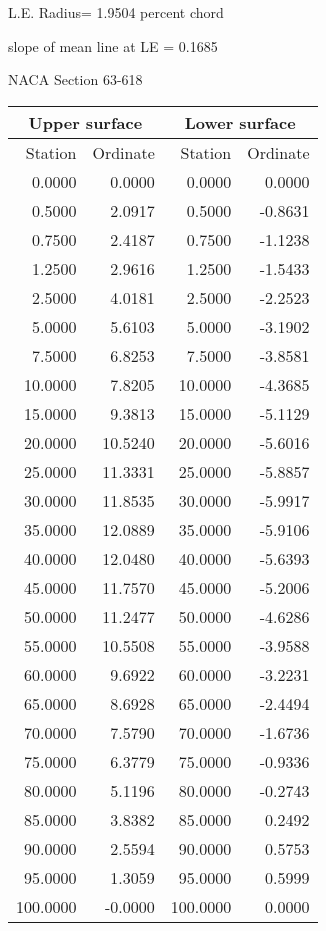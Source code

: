 \documentclass[11pt]{book}
\begin{document}
L.E. Radius=  1.9504 percent chord


 slope of mean line at LE =  0.1685
 \newpage
  \label{s63-618}
 \begin{Large}
 NACA Section 63-618
 \end{Large}
  
 \vspace{8mm}
 \begin{tabular}{|r|r|r|r|} \hline 
 \multicolumn{2}{|c|}{Upper surface} & \multicolumn{2}{|c|}{Lower surface} \\
 \hline
 Station & Ordinate & Station & Ordinate \\
 \hline
0.0000 & 0.0000 & 0.0000 & 0.0000 \\
0.5000 & 2.0917 & 0.5000 & -0.8631 \\
0.7500 & 2.4187 & 0.7500 & -1.1238 \\
1.2500 & 2.9616 & 1.2500 & -1.5433 \\
2.5000 & 4.0181 & 2.5000 & -2.2523 \\
5.0000 & 5.6103 & 5.0000 & -3.1902 \\
7.5000 & 6.8253 & 7.5000 & -3.8581 \\
10.0000 & 7.8205 & 10.0000 & -4.3685 \\
15.0000 & 9.3813 & 15.0000 & -5.1129 \\
20.0000 & 10.5240 & 20.0000 & -5.6016 \\
25.0000 & 11.3331 & 25.0000 & -5.8857 \\
30.0000 & 11.8535 & 30.0000 & -5.9917 \\
35.0000 & 12.0889 & 35.0000 & -5.9106 \\
40.0000 & 12.0480 & 40.0000 & -5.6393 \\
45.0000 & 11.7570 & 45.0000 & -5.2006 \\
50.0000 & 11.2477 & 50.0000 & -4.6286 \\
55.0000 & 10.5508 & 55.0000 & -3.9588 \\
60.0000 & 9.6922 & 60.0000 & -3.2231 \\
65.0000 & 8.6928 & 65.0000 & -2.4494 \\
70.0000 & 7.5790 & 70.0000 & -1.6736 \\
75.0000 & 6.3779 & 75.0000 & -0.9336 \\
80.0000 & 5.1196 & 80.0000 & -0.2743 \\
85.0000 & 3.8382 & 85.0000 & 0.2492 \\
90.0000 & 2.5594 & 90.0000 & 0.5753 \\
95.0000 & 1.3059 & 95.0000 & 0.5999 \\
100.0000 & -0.0000 & 100.0000 & 0.0000 \\
 \hline 
 \end{tabular}
\end{document}
